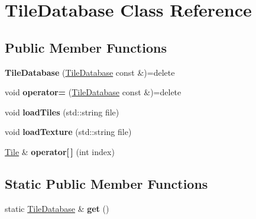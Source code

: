 \hypertarget{classTileDatabase}{\section{Tile\-Database Class Reference}
\label{classTileDatabase}
}
\subsection*{Public Member Functions}
\begin{DoxyCompactItemize}
\item 
\hypertarget{classTileDatabase_a416e304c465d358759c5f75c2d9dd339}{{\bfseries Tile\-Database} (\hyperlink{classTileDatabase}{Tile\-Database} const \&)=delete}\label{classTileDatabase_a416e304c465d358759c5f75c2d9dd339}

\item 
\hypertarget{classTileDatabase_a6fea9bd536a262734b09a39e5b737250}{void {\bfseries operator=} (\hyperlink{classTileDatabase}{Tile\-Database} const \&)=delete}\label{classTileDatabase_a6fea9bd536a262734b09a39e5b737250}

\item 
\hypertarget{classTileDatabase_a986e55f0705dbfb5428931563eff1497}{void {\bfseries load\-Tiles} (std\-::string file)}\label{classTileDatabase_a986e55f0705dbfb5428931563eff1497}

\item 
\hypertarget{classTileDatabase_a1eb9f7c3ff7e497bada7a1475fb271f4}{void {\bfseries load\-Texture} (std\-::string file)}\label{classTileDatabase_a1eb9f7c3ff7e497bada7a1475fb271f4}

\item 
\hypertarget{classTileDatabase_afd8392440590a9a162104d27f93001a8}{\hyperlink{classTile}{Tile} \& {\bfseries operator\mbox{[}$\,$\mbox{]}} (int index)}\label{classTileDatabase_afd8392440590a9a162104d27f93001a8}

\end{DoxyCompactItemize}
\subsection*{Static Public Member Functions}
\begin{DoxyCompactItemize}
\item 
\hypertarget{classTileDatabase_a305f67578059fc81b04b0c99f3065e8d}{static \hyperlink{classTileDatabase}{Tile\-Database} \& {\bfseries get} ()}\label{classTileDatabase_a305f67578059fc81b04b0c99f3065e8d}

\end{DoxyCompactItemize}
